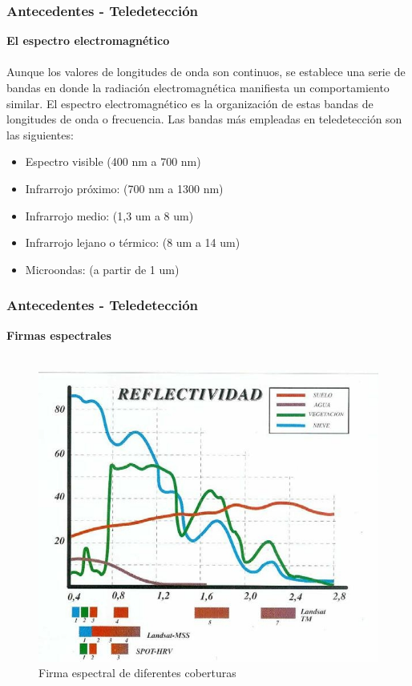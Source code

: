 \documentclass[xcolor=table]{beamer}
\begin{document}
\begin{frame}\frametitle{Antecedentes - Teledetecci\'on}
\textbf{El espectro electromagn\'etico}\\~\\
Aunque los valores de longitudes de onda son continuos, se establece una serie de bandas en donde la radiación electromagnética manifiesta un comportamiento similar. El espectro electromagnético es la organización de estas bandas de longitudes de onda o frecuencia.
Las bandas m\'as empleadas en teledetecci\'on son las siguientes:
\begin{itemize}
\item Espectro visible (400 nm a 700 nm)
\item Infrarrojo próximo: (700 nm a 1300 nm)
\item Infrarrojo medio: (1,3 um a 8 um)
\item Infrarrojo lejano o térmico: (8 um a 14 um)
\item Microondas: (a partir de 1 um)
\end{itemize}

	
\end{frame}
\begin{frame}\frametitle{Antecedentes - Teledetecci\'on}
	\textbf{Firmas espectrales}\\~\\	

\begin{figure}
\centering
\includegraphics[width=0.7\linewidth]{imagenes/espectral}
\caption{Firma espectral de diferentes coberturas}
\label{fig:espectral}
\end{figure}

\end{frame}
\end{document}
